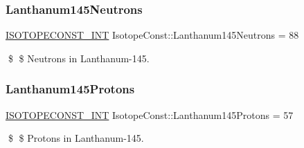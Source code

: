 \subsubsection{\texorpdfstring{Lanthanum145\+Neutrons}{Lanthanum145Neutrons}}
{\footnotesize\ttfamily \mbox{\hyperlink{group___isotope_const-_macros_ga5f18360b3e99483a35c32d789e62621c}{I\+S\+O\+T\+O\+P\+E\+C\+O\+N\+S\+T\+\_\+\+I\+NT}} Isotope\+Const\+::\+Lanthanum145\+Neutrons = 88}

\$ \$ Neutrons in Lanthanum-\/145. \mbox{\label{group___isotope_const-_lanthanum-_la145_gae47b2f7d2268c7a0b7ec2d30a9393a33}} 
\subsubsection{\texorpdfstring{Lanthanum145\+Protons}{Lanthanum145Protons}}
{\footnotesize\ttfamily \mbox{\hyperlink{group___isotope_const-_macros_ga5f18360b3e99483a35c32d789e62621c}{I\+S\+O\+T\+O\+P\+E\+C\+O\+N\+S\+T\+\_\+\+I\+NT}} Isotope\+Const\+::\+Lanthanum145\+Protons = 57}

\$ \$ Protons in Lanthanum-\/145. 